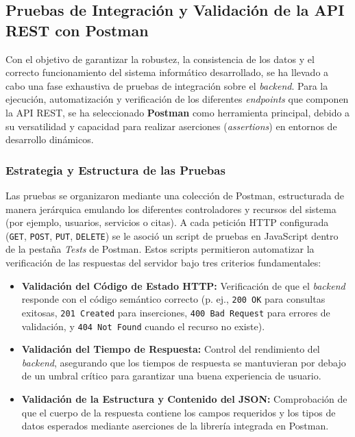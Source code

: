 \subsection{Pruebas de Integración y Validación de la API REST con Postman}

Con el objetivo de garantizar la robustez, la consistencia de los datos y el correcto funcionamiento del sistema informático desarrollado, se ha llevado a cabo una fase exhaustiva de pruebas de integración sobre el \textit{backend}. Para la ejecución, automatización y verificación de los diferentes \textit{endpoints} que componen la API REST, se ha seleccionado \textbf{Postman} como herramienta principal, debido a su versatilidad y capacidad para realizar aserciones (\textit{assertions}) en entornos de desarrollo dinámicos.

\subsubsection{Estrategia y Estructura de las Pruebas}
Las pruebas se organizaron mediante una colección de Postman, estructurada de manera jerárquica emulando los diferentes controladores y recursos del sistema (por ejemplo, usuarios, servicios o citas). A cada petición HTTP configurada (\texttt{GET}, \texttt{POST}, \texttt{PUT}, \texttt{DELETE}) se le asoció un script de pruebas en JavaScript dentro de la pestaña \textit{Tests} de Postman. Estos scripts permitieron automatizar la verificación de las respuestas del servidor bajo tres criterios fundamentales:

\begin{itemize}
    \item \textbf{Validación del Código de Estado HTTP:} Verificación de que el \textit{backend} responde con el código semántico correcto (p. ej., \texttt{200 OK} para consultas exitosas, \texttt{201 Created} para inserciones, \texttt{400 Bad Request} para errores de validación, y \texttt{404 Not Found} cuando el recurso no existe).
    \item \textbf{Validación del Tiempo de Respuesta:} Control del rendimiento del \textit{backend}, asegurando que los tiempos de respuesta se mantuvieran por debajo de un umbral crítico para garantizar una buena experiencia de usuario.
    \item \textbf{Validación de la Estructura y Contenido del JSON:} Comprobación de que el cuerpo de la respuesta contiene los campos requeridos y los tipos de datos esperados mediante aserciones de la librería integrada en Postman.
\end{itemize}

